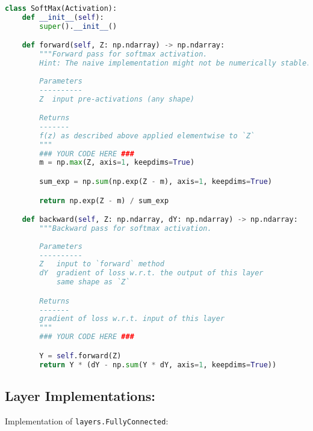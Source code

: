 \begin{lstlisting}[language=Python]
class SoftMax(Activation):
    def __init__(self):
        super().__init__()

    def forward(self, Z: np.ndarray) -> np.ndarray:
        """Forward pass for softmax activation.
        Hint: The naive implementation might not be numerically stable.
        
        Parameters
        ----------
        Z  input pre-activations (any shape)

        Returns
        -------
        f(z) as described above applied elementwise to `Z`
        """
        ### YOUR CODE HERE ###
        m = np.max(Z, axis=1, keepdims=True)

        sum_exp = np.sum(np.exp(Z - m), axis=1, keepdims=True)

        return np.exp(Z - m) / sum_exp

    def backward(self, Z: np.ndarray, dY: np.ndarray) -> np.ndarray:
        """Backward pass for softmax activation.
        
        Parameters
        ----------
        Z   input to `forward` method
        dY  gradient of loss w.r.t. the output of this layer
            same shape as `Z`

        Returns
        -------
        gradient of loss w.r.t. input of this layer
        """
        ### YOUR CODE HERE ###

        Y = self.forward(Z)
        return Y * (dY - np.sum(Y * dY, axis=1, keepdims=True))

\end{lstlisting}


\subsection{Layer Implementations:}

Implementation of \texttt{layers.FullyConnected}:

